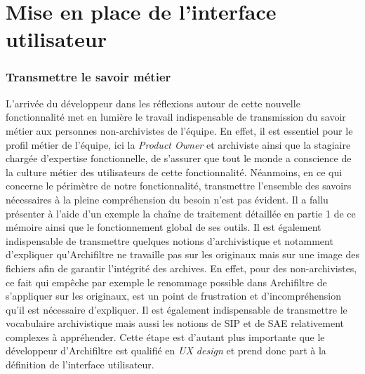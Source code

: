 \chapter{Mise en place de l’interface utilisateur}
\subsection{Transmettre le savoir métier}
L’arrivée du développeur dans les réflexions autour de cette nouvelle fonctionnalité met en lumière le travail indispensable de transmission du savoir métier aux personnes non-archivistes de l’équipe. En effet, il est essentiel pour le profil métier de l’équipe, ici la \textit{\gls{Product Owner}} et archiviste ainsi que la stagiaire chargée d'expertise fonctionnelle, de s’assurer que tout le monde a conscience de la culture métier des utilisateurs de cette fonctionnalité. Néanmoins, en ce qui concerne le périmètre de notre fonctionnalité, transmettre l’ensemble des savoirs nécessaires à la pleine compréhension du besoin n’est pas évident. Il a fallu présenter à l’aide d’un exemple la chaîne de traitement détaillée en partie 1 de ce mémoire ainsi que le fonctionnement global de ses outils. Il est également indispensable de transmettre quelques notions d’archivistique et notamment d’expliquer qu’\gls{Archifiltre} ne travaille pas sur les originaux mais sur une image des fichiers afin de garantir l’intégrité des archives. En effet, pour des non-archivistes, ce fait qui empêche par exemple le renommage possible dans \gls{Archifiltre} de s’appliquer sur les originaux, est un point de frustration et d’incompréhension qu’il est nécessaire d’expliquer. Il est également indispensable de transmettre le vocabulaire archivistique mais aussi les notions de \gls{SIP} et de \gls{SAE} relativement complexes à appréhender. Cette étape est d’autant plus importante que le développeur d’\gls{Archifiltre} est qualifié en \textit{UX design} et prend donc part à la définition de l’interface utilisateur. 


